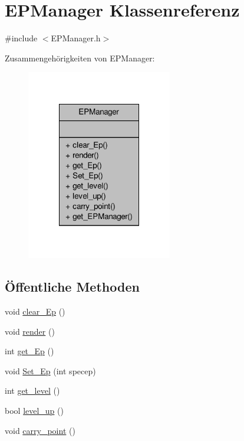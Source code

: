\hypertarget{class_e_p_manager}{\section{E\-P\-Manager Klassenreferenz}
\label{class_e_p_manager}
}


{\ttfamily \#include $<$E\-P\-Manager.\-h$>$}



Zusammengehörigkeiten von E\-P\-Manager\-:
\nopagebreak
\begin{figure}[H]
\begin{center}
\leavevmode
\includegraphics[width=180pt]{class_e_p_manager__coll__graph}
\end{center}
\end{figure}
\subsection*{Öffentliche Methoden}
\begin{DoxyCompactItemize}
\item 
void \hyperlink{class_e_p_manager_ab16a464979242e27ab1de48a2fa8d193}{clear\-\_\-\-Ep} ()
\item 
void \hyperlink{class_e_p_manager_ae0839a39f9ee6fd51d67faafbd6ff560}{render} ()
\item 
int \hyperlink{class_e_p_manager_aadec631b4cc9f5de5f4f8040aeeb1778}{get\-\_\-\-Ep} ()
\item 
void \hyperlink{class_e_p_manager_a300554dc6cd44d47ece8ebe6d8ed2daa}{Set\-\_\-\-Ep} (int specep)
\item 
int \hyperlink{class_e_p_manager_af8b59848547dee1ab3967aaebcf8fc3a}{get\-\_\-level} ()
\item 
bool \hyperlink{class_e_p_manager_ad6ec1c64ea6b54f646bb793ad53e0279}{level\-\_\-up} ()
\item 
void \hyperlink{class_e_p_manager_a1eac7449962fd356c97f588dbbf0e39e}{carry\-\_\-point} ()
\end{DoxyCompactItemize}
